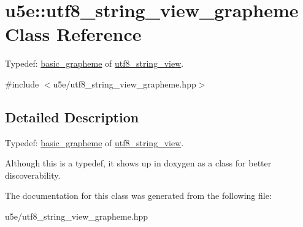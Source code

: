\hypertarget{classu5e_1_1utf8__string__view__grapheme}{}\section{u5e\+:\+:utf8\+\_\+string\+\_\+view\+\_\+grapheme Class Reference}
\label{classu5e_1_1utf8__string__view__grapheme}


Typedef\+: \hyperlink{classu5e_1_1basic__grapheme}{basic\+\_\+grapheme} of \hyperlink{classu5e_1_1utf8__string__view}{utf8\+\_\+string\+\_\+view}.  




{\ttfamily \#include $<$u5e/utf8\+\_\+string\+\_\+view\+\_\+grapheme.\+hpp$>$}



\subsection{Detailed Description}
Typedef\+: \hyperlink{classu5e_1_1basic__grapheme}{basic\+\_\+grapheme} of \hyperlink{classu5e_1_1utf8__string__view}{utf8\+\_\+string\+\_\+view}. 

Although this is a typedef, it shows up in doxygen as a class for better discoverability. 

The documentation for this class was generated from the following file\+:\begin{DoxyCompactItemize}
\item 
u5e/utf8\+\_\+string\+\_\+view\+\_\+grapheme.\+hpp\end{DoxyCompactItemize}
